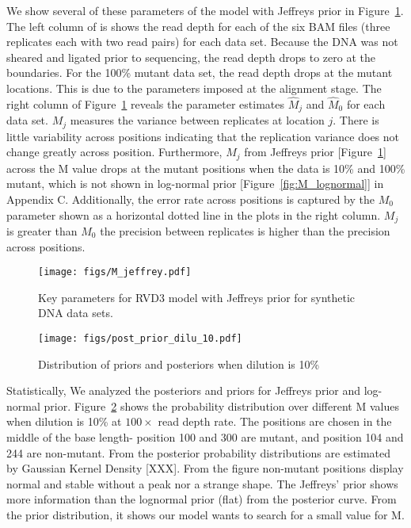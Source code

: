 \documentclass[11pt,reqno]{amsart}
\begin{document}
We show several of these parameters of the model with Jeffreys prior in Figure~\ref{fig:M_jeffrey}. The left column of is shows the read depth for each of the six BAM files (three replicates each with two read pairs) for each data set. Because the DNA was not sheared and ligated prior to sequencing, the read depth drops to zero at the boundaries. For the 100\% mutant data set, the read depth drops at the mutant locations. This is due to the parameters imposed at the alignment stage. The right column of Figure~\ref{fig:M_jeffrey} reveals the parameter estimates $\hat{M}_j$ and $\hat{M}_0$ for each data set. $M_j$ measures the variance between replicates at location $j$. There is little variability across positions indicating that the replication variance does not change greatly across position. Furthermore, $M_j$ from Jeffreys prior [Figure~\ref{fig:M_jeffrey}] across the M value drops at the mutant positions when the data is 10\% and 100\% mutant, which is not shown in log-normal prior [Figure~\ref{fig:M_lognormal}] in Appendix C. Additionally, the error rate across positions is captured by the $M_0$ parameter shown as a horizontal dotted line in the plots in the right column. $M_j$ is greater than $M_0$ the precision between replicates is higher than the precision across positions.

\begin{figure}[htbp]
\begin{center}
\texttt{[image: figs/M\_jeffrey.pdf]}
\caption{Key parameters for RVD3 model with Jeffreys prior for synthetic DNA data sets.}
\label{fig:M_jeffrey}
\end{center}
\end{figure}

\begin{figure}[htbp]
\begin{center}
\texttt{[image: figs/post\_prior\_dilu\_10.pdf]}
\caption{Distribution of priors and posteriors when dilution is 10\%}
\label{fig:dilu_10}
\end{center}
\end{figure}

Statistically, We analyzed the posteriors and priors for Jeffreys prior and log-normal prior. Figure~\ref{fig:dilu_10} shows the probability distribution over different M values when dilution is 10\% at $100\times$ read depth rate. The positions are chosen in the middle of the base length- position 100 and 300 are mutant, and position 104 and 244 are non-mutant. From the posterior probability distributions are estimated by Gaussian Kernel Density [XXX]. From the figure non-mutant positions display normal and stable without a peak nor a strange shape. The Jeffreys' prior shows more information than the lognormal prior (flat) from the posterior curve. From the prior distribution, it shows our model wants to search for a small value for M.
\end{document}
